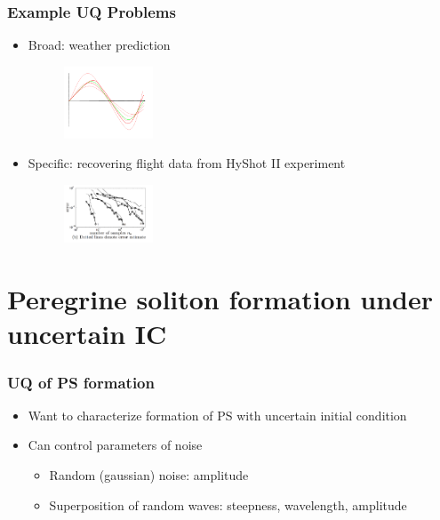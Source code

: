 \documentclass{beamer}
\def\b{\begin}
\def\e{\end}
\theoremstyle{plain}
\theoremstyle{definition}
\begin{document}
\frame
{
\frametitle{Example UQ Problems}
\b{itemize}
\item Broad: weather prediction
\begin{figure}
\begin{center}
\includegraphics[width=100px]{UQ_weather.png}
\end{center}
\end{figure}

\pause
\item Specific: recovering flight data from HyShot II experiment
\begin{figure}
\begin{center}
\includegraphics[width=100px]{UQ_hyshot.png}
\end{center}
\end{figure}
\e{itemize}
}



\section{Peregrine soliton formation under uncertain IC}

\frame
{
\frametitle{UQ of PS formation}
\b{itemize}
\item Want to characterize formation of PS with uncertain initial condition\\[25pt]

\pause
\item Can control parameters of noise\\[5pt]
\b{itemize}
\item Random (gaussian) noise: amplitude\\[5pt]
\item Superposition of random waves: steepness, wavelength, amplitude
 
\e{itemize}
\e{itemize}
}



\end{document}
